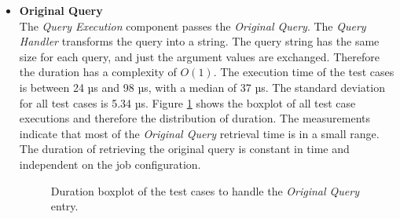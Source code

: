 \documentclass[draft,final]{vutinfth} %
\begin{document}
\begin{itemize}
	\item \textbf{Original Query} \\
	The \textit{Query Execution} component passes the \textit{Original Query}. The \textit{Query Handler} transforms the query into a string. The query string has the same size for each query, and just the argument values are exchanged. Therefore the duration has a complexity of $O(1)$. The execution time of the test cases is between 24 µs and 98 µs, with a median of 37 µs. The standard deviation for all test cases is 5.34 µs. Figure \ref{fig:evaluation_perf_original} shows the boxplot of all test case executions and therefore the distribution of duration. The measurements indicate that most of the \textit{Original Query} retrieval time is in a small range. The duration of {retrieving the original query} is constant in time and independent on the job configuration. 
	\begin{figure}[!h]
		\centering
		\caption{Duration boxplot of the test cases to handle the \textit{Original Query} entry.}
		\label{fig:evaluation_perf_original}
	\end{figure}


\end{itemize}
\end{document}
